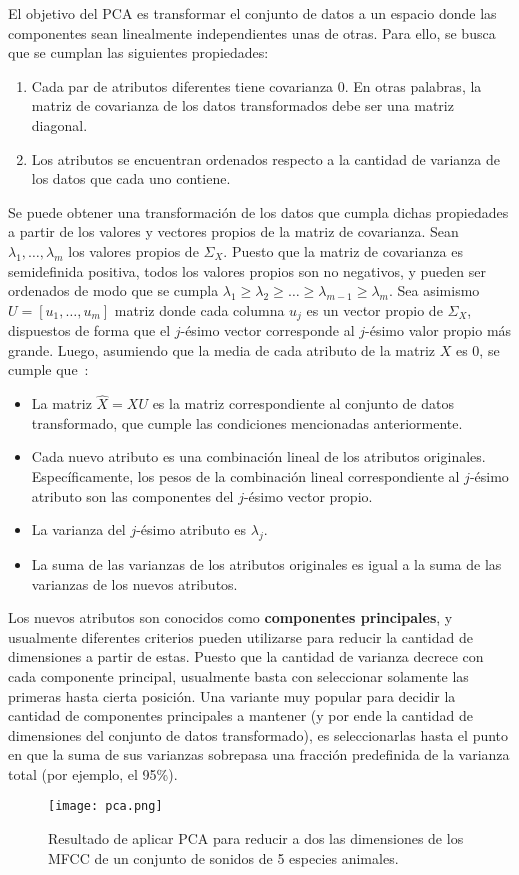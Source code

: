 El objetivo del PCA es transformar el conjunto de datos a un espacio donde las componentes sean linealmente independientes unas de otras.
Para ello, se busca que se cumplan las siguientes propiedades:

\begin{enumerate}
    \item Cada par de atributos diferentes tiene covarianza 0.
    En otras palabras, la matriz de covarianza de los datos transformados debe ser una matriz diagonal.
    \item Los atributos se encuentran ordenados respecto a la cantidad de varianza de los datos que cada uno contiene.
\end{enumerate}

Se puede obtener una transformación de los datos que cumpla dichas propiedades a partir de los valores y vectores propios de la matriz de covarianza.
Sean $\lambda_1,\dots,\lambda_m$ los valores propios de $\Sigma_X$.
Puesto que la matriz de covarianza es semidefinida positiva, todos los valores propios son no negativos, y pueden ser ordenados de modo que se cumpla $\lambda_1 \geq \lambda_2 \geq \dots \geq \lambda_{m-1} \geq \lambda_m$.
Sea asimismo $U = [u_1,\dots,u_m]$ matriz donde cada columna $u_j$ es un vector propio de $\Sigma_X$, dispuestos de forma que el $j$-ésimo vector corresponde al $j$-ésimo valor propio más grande.
Luego, asumiendo que la media de cada atributo de la matriz $X$ es 0, se cumple que~\cite{Smith02,Tan05}:

\begin{itemize}
    \item La matriz $\hat{X} = XU$ es la matriz correspondiente al conjunto de datos transformado, que cumple las condiciones mencionadas anteriormente.
    \item Cada nuevo atributo es una combinación lineal de los atributos originales. Específicamente, los pesos de la combinación lineal correspondiente al $j$-ésimo atributo son las componentes del $j$-ésimo vector propio.
    \item La varianza del $j$-ésimo atributo es $\lambda_j$.
    \item La suma de las varianzas de los atributos originales es igual a la suma de las varianzas de los nuevos atributos.
\end{itemize}

Los nuevos atributos son conocidos como \textbf{componentes principales}, y usualmente diferentes criterios pueden utilizarse para reducir la cantidad de dimensiones a partir de estas.
Puesto que la cantidad de varianza decrece con cada componente principal, usualmente basta con seleccionar solamente las primeras hasta cierta posición.
Una variante muy popular para decidir la cantidad de componentes principales a mantener (y por ende la cantidad de dimensiones del conjunto de datos transformado), es seleccionarlas hasta el punto en que la suma de sus varianzas sobrepasa una fracción predefinida de la varianza total (por ejemplo, el 95\%).

\begin{figure}[!h]
    \centering
    \texttt{[image: pca.png]}
    \caption{Resultado de aplicar PCA para reducir a dos las dimensiones de los MFCC de un conjunto de sonidos de 5 especies animales.}
    \label{img:pca}
\end{figure}
